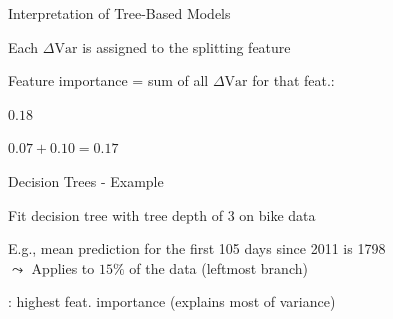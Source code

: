 \documentclass[10pt,compress,t,notes=noshow, xcolor=table]{beamer}
\begin{document}
\begin{framev}[align=top]{Interpretation of Tree-Based Models}
{
}{
\spacer[0.6]
\begin{itemizeM}
\item Each $\Delta\text{Var}$ is assigned to the splitting feature
\item Feature importance = sum of all $\Delta\text{Var}$ for that feat.:
\begin{itemizeS}
\item[$x_j$:] $0.18$
\item[$x_k$:] $0.07 + 0.10 = 0.17$
\end{itemizeS}
\end{itemizeM}
}
\end{framev}


\begin{framev}[align=top]{Decision Trees - Example}
\begin{itemizeM}
\item Fit decision tree with tree depth of 3 on bike data
\item E.g., mean prediction for the first 105 days since 2011 is 1798\\
$\leadsto$ Applies to $15\%$ of the data (leftmost branch)
\item {}: highest feat. importance (explains most of variance)
\end{itemizeM}
\end{framev}
\end{document}
